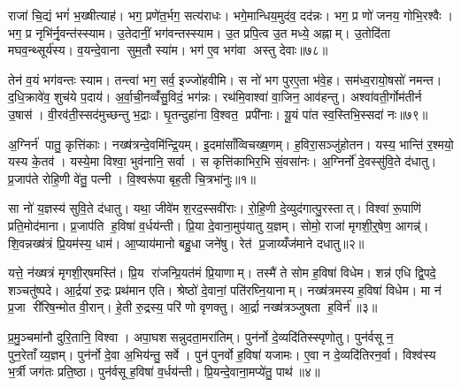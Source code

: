 राजा॑ चि॒द्यं भगं॑ भ॒ख्षीत्याह॑। भग॒ प्रणे॑त॒र्भग॒ सत्य॑राधः। भगे॒मान्धिय॒मुद॑व॒ दद॑न्नः। भग॒ प्र णो॑ जनय॒ गोभि॒रश्वैः। भग॒ प्र नृभि॑र्नृ॒वन्त॑स्स्याम। उ॒तेदानीं॒ भग॑वन्तस्स्याम। उ॒त प्रपि॒त्व उ॒त मध्ये॒ अह्नाम्। उ॒तोदि॑ता मघव॒न्थ्सूर्य॑स्य। व॒यन्दे॒वाना सुम॒तौ स्या॑म। भग॑ ए॒व भग॑वा अस्तु देवाः॥७८॥

तेन॑ व॒यं भग॑वन्तः स्याम। तन्त्वा॑ भग॒ सर्व॒ इज्जो॑हवीमि। स नो॑ भग पुरए॒ता भ॑वे॒ह। सम॑ध्व॒रायो॒षसो॑ नमन्त। द॒धि॒क्रावे॑व॒ शुच॑ये प॒दाय॑। अ॒र्वा॒ची॒नव्वँ॑सु॒विदं॒ भग॑न्नः। रथ॑मि॒वाश्वा॑ वा॒जिन॒ आव॑हन्तु। अश्वा॑वती॒र्गोम॑तीर्न उ॒षास॑। वी॒रव॑ती॒स्सद॑मुच्छन्तु भ॒द्राः। घृ॒तन्दुहा॑ना वि॒श्वत॒ प्रपी॑नाः। यू॒यं पा॑त स्व॒स्तिभि॒स्सदा॑ नः॥७९॥

\clearpage
{}


\setcounter{anuvakam}{0}
अ॒ग्निर्न॑ पातु॒ कृत्ति॑काः। नख्ष॑त्रन्दे॒वमि॑न्द्रि॒यम्। इ॒दमा॑साँव्विचख्ष॒णम्। ह॒विरा॒सञ्जु॑होतन। यस्य॒ भान्ति॑ र॒श्मयो॒ यस्य के॒तव॑। यस्ये॒मा विश्वा॒ भुव॑नानि॒ सर्वा। स कृत्ति॑काभिर॒भि सं॒वसा॑नः। अ॒ग्निर्नो॑ दे॒वस्सु॑वि॒ते द॑धातु। प्र॒जाप॑ते रोहि॒णी वे॑तु॒ पत्नी। वि॒श्वरू॑पा बृह॒ती चि॒त्रभा॑नुः॥१॥

सा नो॑ य॒ज्ञस्य॑ सुवि॒ते द॑धातु। यथा॒ जीवे॑म श॒रद॒स्सवी॑राः। रो॒हि॒णी दे॒व्युद॑गात्पु॒रस्तात्। विश्वा॑ रू॒पाणि॑ प्रति॒मोद॑माना। प्र॒जाप॑ति ह॒विषा॑ व॒र्धय॑न्ती। प्रि॒या दे॒वाना॒मुप॑यातु य॒ज्ञम्। सोमो॒ राजा॑ मृगशी॒र्॒षेण॒ आगन्न्॑। शि॒वन्नख्ष॑त्रं प्रि॒यम॑स्य॒ धाम॑। आ॒प्याय॑मानो बहु॒धा जने॑षु। रेत॑ प्र॒जाय्यँज॑माने दधातु॥२॥

यत्ते॒ न॑ख्षत्रं मृगशी॒र्‌षमस्ति॑। प्रि॒य रा॑जन्प्रि॒यत॑मं प्रि॒याणाम्। तस्मै॑ ते सोम ह॒विषा॑ विधेम। शन्न॑ एधि द्वि॒पदे॒ शञ्चतु॑ष्पदे। आ॒र्द्रया॑ रु॒द्रः प्रथ॑मान एति। श्रेष्ठो॑ दे॒वानां॒ पति॑रघ्नि॒यानाम्। नख्ष॑त्रमस्य ह॒विषा॑ विधेम। मा न॑ प्र॒जा री॑रिष॒न्मोत वी॒रान्। हे॒ती रु॒द्रस्य॒ परि॑ णो वृणक्तु। आ॒र्द्रा नख्ष॑त्रञ्जुषता ह॒विर्न॑॥३॥

प्र॒मु॒ञ्चमा॑नौ दुरि॒तानि॒ विश्वा। अपा॒घशसन्नुदता॒मरा॑तिम्। पुन॑र्नो दे॒व्यदि॑तिस्स्पृणोतु। पुन॑र्वसू न॒ पुन॒रेताँय्य॒ज्ञम्। पुन॑र्नो दे॒वा अ॒भिय॑न्तु॒ सर्वे। पुन॑पुनर्वो ह॒विषा॑ यजामः। ए॒वा न दे॒व्यदि॑तिरन॒र्वा। विश्व॑स्य भ॒र्त्री जग॑तः प्रति॒ष्ठा। पुन॑र्वसू ह॒विषा॑ व॒र्धय॑न्ती। प्रि॒यन्दे॒वाना॒मप्ये॑तु॒ पाथ॑॥४॥

